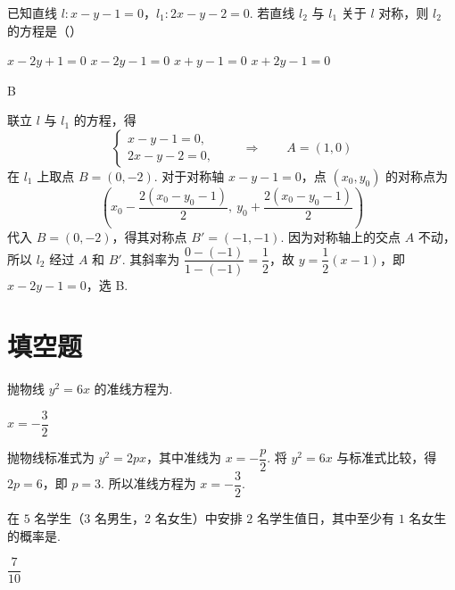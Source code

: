 \begin{problem}
已知直线 \(l:x-y-1=0\)，\(l_{1}:2x-y-2=0\). 若直线 \(l_{2}\) 与 \(l_{1}\) 关于 \(l\) 对称，则 \(l_{2}\) 的方程是（\quad）

\choices
    {\(x-2y+1=0\)}
    {\(x-2y-1=0\)}
    {\(x+y-1=0\)}
    {\(x+2y-1=0\)}
\end{problem}

\begin{answer}
B
\end{answer}

\begin{solution}
联立 \(l\) 与 \(l_{1}\) 的方程，得
\[
\begin{cases}
x-y-1=0,\\
2x-y-2=0,
\end{cases}
\qquad\Longrightarrow\qquad A=(1,0)
\]
在 \(l_{1}\) 上取点 \(B=(0,-2)\). 对于对称轴 \(x-y-1=0\)，点 \((x_{0},y_{0})\) 的对称点为
\[
\left(x_{0}-\frac{2(x_{0}-y_{0}-1)}2,\ y_{0}+\frac{2(x_{0}-y_{0}-1)}2\right)
\]
代入 \(B=(0,-2)\)，得其对称点 \(B'=(-1,-1)\). 因为对称轴上的交点 \(A\) 不动，所以 \(l_{2}\) 经过 \(A\) 和 \(B'\). 其斜率为 \(\dfrac{0-(-1)}{1-(-1)}=\dfrac12\)，故 \(y=\dfrac12(x-1)\)，即 \(x-2y-1=0\)，选 B.
\end{solution}

\section{填空题}

\begin{problem}
抛物线 \(y^{2}=6x\) 的准线方程为\fillinblank{}.
\end{problem}

\begin{answer}
\(x=-\dfrac{3}{2}\)
\end{answer}

\begin{solution}
抛物线标准式为 \(y^{2}=2px\)，其中准线为 \(x=-\dfrac p2\). 将 \(y^{2}=6x\) 与标准式比较，得 \(2p=6\)，即 \(p=3\). 所以准线方程为 \(x=-\dfrac32\).
\end{solution}

\begin{problem}
在 \(5\) 名学生（\(3\) 名男生，\(2\) 名女生）中安排 \(2\) 名学生值日，其中至少有 \(1\) 名女生的概率是\fillinblank{}.
\end{problem}

\begin{answer}
\(\dfrac{7}{10}\)
\end{answer}

